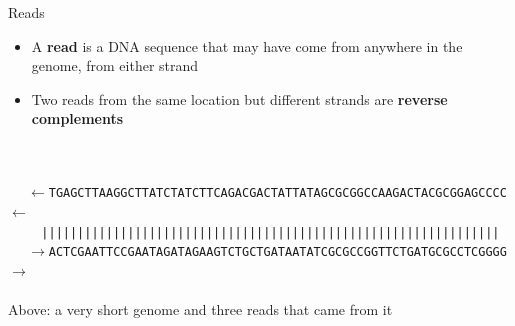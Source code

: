 \documentclass[xcolor=dvipsnames]{beamer}
\begin{document}
\begin{frame}{Reads}
    \begin{itemize}
        \item A {\bf read} is a DNA sequence that may have come from anywhere in
              the genome, from either strand
        \item Two reads from the same location but different strands are {\bf
              reverse complements}
    \end{itemize}
        \vspace{0.5cm}
        {\scriptsize
            {\tt \ \ }
            \\
            {\tt \ \ }
            \\
            {\tt \ \ }
            {\tt $\leftarrow$TGAGCTTAAGGCTTATCTATCTTCAGACGACTATTATAGCGCGGCCAAGACTACGCGGAGCCCC$\leftarrow$} \\
            \vspace{-0.1cm}
            {\tt \ \ \ \ } {\tt |||||||||||||||||||||||||||||||||||||||||||||||||||||||||||||||| } \\
            \vspace{-0.1cm}
            {\tt \ \ }
            {\tt $\rightarrow$ACTCGAATTCCGAATAGATAGAAGTCTGCTGATAATATCGCGCCGGTTCTGATGCGCCTCGGGG$\rightarrow$} \\
            \vspace{-0.16cm}
            {\tt \ \ } 
            \vspace{0.5cm}
        }
        \\
        {Above: a very short genome and three reads that came from it}
\end{frame}
\end{document}
